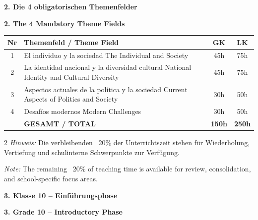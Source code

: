 \documentclass[10pt,a4paper]{article}
\newcommand{\bil}[2]{%
\begin{paracol}{2}
\small #1
\switchcolumn
\small\textcolor{english}{#2}
\end{paracol}
}
\newcommand{\secbil}[2]{%
\vspace{8pt}
\noindent\colorbox{spanisch}{\parbox{0.48\textwidth}{\color{white}\bfseries #1}}%
\hfill%
\colorbox{english}{\parbox{0.48\textwidth}{\color{white}\bfseries #2}}
\vspace{4pt}
}
\begin{document}
\secbil{2. Die 4 obligatorischen Themenfelder}{2. The 4 Mandatory Theme Fields}

\vspace{2mm}

\begin{center}
\small
\begin{tabular}{|c|p{5.5cm}|c|c|}
\hline
\rowcolor{lightgray}
\textbf{Nr} & \textbf{Themenfeld / Theme Field} & \textbf{GK} & \textbf{LK} \\
\hline
1 & El individuo y la sociedad \newline \textcolor{english}{\footnotesize The Individual and Society} & 45h & 75h \\
\hline
2 & La identidad nacional y la diversidad cultural \newline \textcolor{english}{\footnotesize National Identity and Cultural Diversity} & 45h & 75h \\
\hline
3 & Aspectos actuales de la política y la sociedad \newline \textcolor{english}{\footnotesize Current Aspects of Politics and Society} & 30h & 50h \\
\hline
4 & Desafíos modernos \newline \textcolor{english}{\footnotesize Modern Challenges} & 30h & 50h \\
\hline
\rowcolor{lightred}
& \textbf{GESAMT / TOTAL} & \textbf{150h} & \textbf{250h} \\
\hline
\end{tabular}
\end{center}

\vspace{2mm}

\bil{%
\textit{Hinweis:} Die verbleibenden ~20\% der Unterrichtszeit stehen für Wiederholung, Vertiefung und schulinterne Schwerpunkte zur Verfügung.
}{%
\textit{Note:} The remaining ~20\% of teaching time is available for review, consolidation, and school-specific focus areas.
}

\secbil{3. Klasse 10 -- Einführungsphase}{3. Grade 10 -- Introductory Phase}
\end{document}
